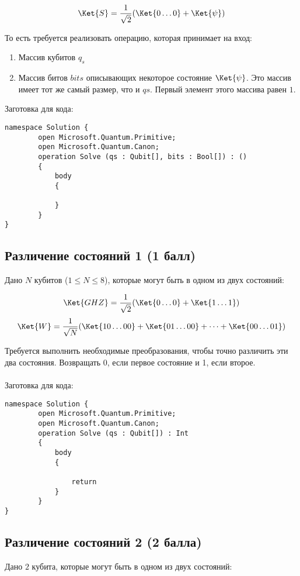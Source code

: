 \documentclass{article}
\begin{document}
$$\Ket{S} = \frac{1}{\sqrt2}(\Ket{0\dots0} +\Ket{\psi})$$

То есть требуется реализовать операцию, которая принимает на вход:

\begin{enumerate}
    \item Массив кубитов $q_s$
    \item Массив битов $bits$ описывающих некоторое состояние $\Ket{\psi}$. Это массив имеет тот же самый размер, что и $qs$. Первый элемент этого массива равен $1$.
\end{enumerate}


Заготовка для кода:
\begin{lstlisting}
namespace Solution {
        open Microsoft.Quantum.Primitive;
        open Microsoft.Quantum.Canon;
        operation Solve (qs : Qubit[], bits : Bool[]) : ()
        {
            body
            {

            }
        }
}
\end{lstlisting}


\subsection{Различение состояний 1 (1 балл)}

Дано $N$ кубитов ($1 \le N \le 8$), которые могут быть в одном из двух состояний:

$$\Ket{GHZ} = \frac{1}{\sqrt2}(\Ket{0\dots0} +\Ket{1\dots1})$$
$$\Ket{W} = \frac{1}{\sqrt N}(\Ket{10\dots00}+\Ket{01\dots00} + \dots +\Ket{00\dots01})$$

Требуется выполнить необходимые преобразования, чтобы точно различить эти два состояния. Возвращать $0$, если первое состояние и 1, если второе. 
\\\\
Заготовка для кода:
\begin{lstlisting}
namespace Solution {
        open Microsoft.Quantum.Primitive;
        open Microsoft.Quantum.Canon;
        operation Solve (qs : Qubit[]) : Int
        {
            body
            {

                return 
            }
        }
}
\end{lstlisting}


\subsection{Различение состояний 2 (2 балла)}

Дано $2$ кубита, которые могут быть в одном из двух состояний:
\end{document}

